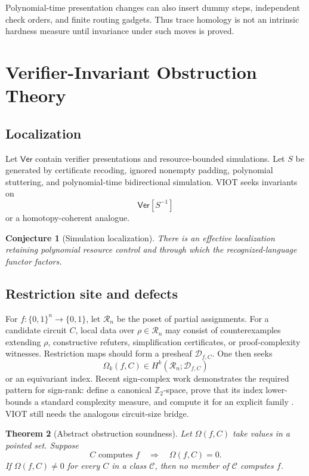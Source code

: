 \documentclass[11pt]{article}
\newtheorem{theorem}{Theorem}[section]
\newtheorem{conjecture}[theorem]{Conjecture}
\theoremstyle{definition}
\begin{document}
Polynomial-time presentation changes can also insert dummy steps, independent
check orders, and finite routing gadgets. Thus trace homology is not an
intrinsic hardness measure until invariance under such moves is proved.

\section{Verifier-Invariant Obstruction Theory}
\label{sec:viot}

\subsection{Localization}

Let \(\mathsf{Ver}\) contain verifier presentations and resource-bounded
simulations. Let \(S\) be generated by certificate recoding, ignored nonempty
padding, polynomial stuttering, and polynomial-time bidirectional simulation.
VIOT seeks invariants on
\[
 \mathsf{Ver}[S^{-1}]
\]
or a homotopy-coherent analogue.

\begin{conjecture}[Simulation localization]
There is an effective localization retaining polynomial resource control and
through which the recognized-language functor factors.
\end{conjecture}

\subsection{Restriction site and defects}

For \(f:\{0,1\}^n\to\{0,1\}\), let \(\mathcal R_n\) be the poset of partial
assignments. For a candidate circuit \(C\), local data over
\(\rho\in\mathcal R_n\) may consist of counterexamples extending \(\rho\),
constructive refuters, simplification certificates, or proof-complexity
witnesses. Restriction maps should form a presheaf \(\mathcal D_{f,C}\).
One then seeks
\[
 \Omega_k(f,C)\in H^k(\mathcal R_n;\mathcal D_{f,C})
\]
or an equivariant index. Recent sign-complex work demonstrates the required
pattern for sign-rank: define a canonical \(\mathbb Z_2\)-space, prove that
its index lower-bounds a standard complexity measure, and compute it for an
explicit family \cite{FHV}. VIOT still needs the analogous circuit-size
bridge.

\begin{theorem}[Abstract obstruction soundness]
Let \(\Omega(f,C)\) take values in a pointed set. Suppose
\[
 C\text{ computes }f\quad\Longrightarrow\quad\Omega(f,C)=0.
\]
If \(\Omega(f,C)\ne0\) for every \(C\) in a class \(\mathcal C\), then no
member of \(\mathcal C\) computes \(f\).
\end{theorem}
\end{document}
